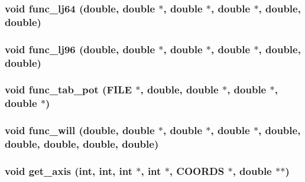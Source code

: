 \subsubsection{\setlength{\rightskip}{0pt plus 5cm}void func\_\-lj64 (double, double $\ast$, double $\ast$, double $\ast$, double, double)}\label{test_2dzug_2proto__energy_8h_85ca9ac5b4974f04bc05c470bd554ea7}


\subsubsection{\setlength{\rightskip}{0pt plus 5cm}void func\_\-lj96 (double, double $\ast$, double $\ast$, double $\ast$, double, double)}\label{test_2dzug_2proto__energy_8h_9c0de6eb620bd7ff75ab095e42110602}


\subsubsection{\setlength{\rightskip}{0pt plus 5cm}void func\_\-tab\_\-pot (FILE $\ast$, double, double $\ast$, double $\ast$, double $\ast$)}\label{test_2dzug_2proto__energy_8h_29d28fc2933bc9d591e973896b2d06d3}


\subsubsection{\setlength{\rightskip}{0pt plus 5cm}void func\_\-will (double, double $\ast$, double $\ast$, double $\ast$, double, double, double, double, double)}\label{test_2dzug_2proto__energy_8h_321c9734615b779051d4efff975f830a}


\subsubsection{\setlength{\rightskip}{0pt plus 5cm}void get\_\-axis (int, int, int $\ast$, int $\ast$, {\bf COORDS} $\ast$, double $\ast$$\ast$)}\label{test_2dzug_2proto__energy_8h_87c38d7c3c7bf8edccf2633cbc807b3b}


